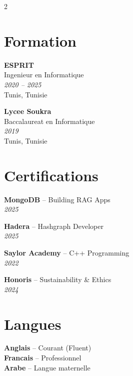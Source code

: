 \documentclass[10pt,a4paper]{article}
\begin{document}
\vspace{5pt}
\begin{multicols}{2}

\section*{Formation}
\vspace{2pt}
{\small
\textbf{ESPRIT}\\[1pt]
Ingenieur en Informatique\\[1pt]
\textit{2020 -- 2025}\\[1pt]
Tunis, Tunisie

\vspace{4pt}
\textbf{Lycee Soukra}\\[1pt]
Baccalaureat en Informatique\\[1pt]
\textit{2019}\\[1pt]
Tunis, Tunisie
}

\vspace{4pt}
\section*{Certifications}
\vspace{2pt}
{\small
\textbf{MongoDB} -- Building RAG Apps\\[1pt]
\textit{2025}

\vspace{2pt}
\textbf{Hadera} -- Hashgraph Developer\\[1pt]
\textit{2025}

\vspace{2pt}
\textbf{Saylor Academy} -- C++ Programming\\[1pt]
\textit{2022}

\vspace{2pt}
\textbf{Honoris} -- Sustainability \& Ethics\\[1pt]
\textit{2024}
}

\columnbreak

\section*{Langues}
\vspace{2pt}
{\small
\textbf{Anglais} -- Courant (Fluent)\\[2pt]
\textbf{Francais} -- Professionnel\\[2pt]
\textbf{Arabe} -- Langue maternelle
}

\vspace{4pt}

\end{multicols}
\end{document}
